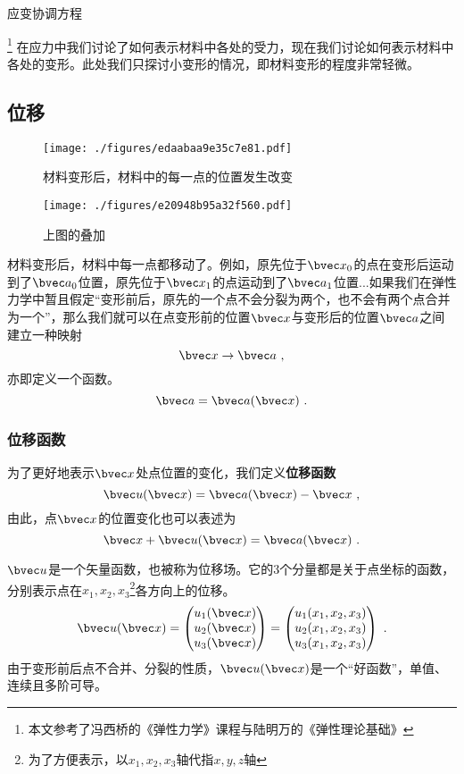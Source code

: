 
\begin{issues}
\issueTODO 
应变协调方程
\end{issues}

\footnote{本文参考了冯西桥的《弹性力学》课程与陆明万的《弹性理论基础》}
在应力中我们讨论了如何表示材料中各处的受力，现在我们讨论如何表示材料中各处的变形。此处我们只探讨小变形的情况，即材料变形的程度非常轻微。
\subsection{位移}
\begin{figure}[ht]
\centering
\texttt{[image: ./figures/edaabaa9e35c7e81.pdf]}
\caption{材料变形后，材料中的每一点的位置发生改变} \label{fig_Strain_1}
\end{figure}
\begin{figure}[ht]
\centering
\texttt{[image: ./figures/e20948b95a32f560.pdf]}
\caption{上图的叠加} \label{fig_Strain_2}
\end{figure}

材料变形后，材料中每一点都移动了。例如，原先位于$\bvec x_0$的点在变形后运动到了$\bvec a_0$位置，原先位于$\bvec x_1$的点运动到了$\bvec a_1$位置...如果我们在弹性力学中暂且假定“变形前后，原先的一个点不会分裂为两个，也不会有两个点合并为一个”，那么我们就可以在点变形前的位置$\bvec x$与变形后的位置$\bvec a$之间建立一种映射$$\bvec x\rightarrow \bvec a~,$$亦即定义一个函数。$$\bvec a = \bvec a (\bvec x)~.$$

\subsubsection{位移函数}
为了更好地表示$\bvec x$处点位置的变化，我们定义\textbf{位移函数}
\begin{equation}
\bvec u (\bvec x) =\bvec a (\bvec x) - \bvec x~,
\end{equation}
由此，点$\bvec x$的位置变化也可以表述为
\begin{equation}
\bvec x + \bvec u (\bvec x) =\bvec a (\bvec x) ~.
\end{equation}

$\bvec u$是一个矢量函数，也被称为位移场。它的3个分量都是关于点坐标的函数，分别表示点在$x_1, x_2, x_3$\footnote{为了方便表示，以$x_1, x_2, x_3$轴代指$x,y,z$轴}各方向上的位移。
$$\bvec u(\bvec x) = 
\begin{pmatrix}
u_1(\bvec x)\\
u_2(\bvec x)\\
u_3(\bvec x)\\
\end{pmatrix}
=
\begin{pmatrix}
u_1(x_1, x_2, x_3)\\
u_2(x_1, x_2, x_3)\\
u_3(x_1, x_2, x_3)\\
\end{pmatrix}~.
$$
由于变形前后点不合并、分裂的性质，$\bvec u(\bvec x)$是一个“好函数”，单值、连续且多阶可导。

